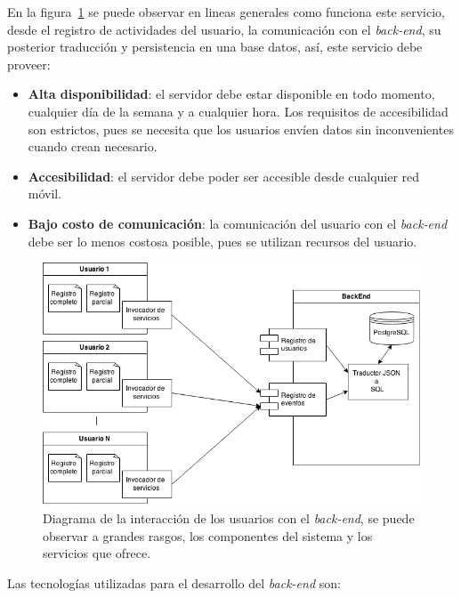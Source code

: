 En la figura~\ref{fig:backend_diagrama} se puede observar en lineas generales
como funciona este servicio, desde el registro de actividades del usuario, la
comunicación con el \textit{back-end}, su posterior traducción y persistencia en
una base datos, así, este servicio debe proveer:

\begin{itemize}
    \item \textbf{Alta disponibilidad}: el servidor debe estar disponible en
        todo momento, cualquier día de la semana y a cualquier hora. Los
        requisitos de accesibilidad son estrictos, pues se necesita que los
        usuarios envíen datos sin inconvenientes cuando crean necesario.
    \item \textbf{Accesibilidad}: el servidor debe poder ser accesible desde
        cualquier red móvil.
    \item \textbf{Bajo costo de comunicación}: la comunicación del usuario con
        el \textit{back-end} debe ser lo menos costosa posible, pues se utilizan
        recursos del usuario.
\end{itemize}

\begin{figure}[H]
\centering
\includegraphics[scale=0.4]{tecnologias/images/backend_diagrama.png}
\caption{Diagrama de la interacción de los usuarios con el \textit{back-end}, se
    puede observar a grandes rasgos, los componentes del sistema y los servicios
    que ofrece.}
\label{fig:backend_diagrama}
\end{figure}

Las tecnologías utilizadas para el desarrollo del \textit{back-end} son:

